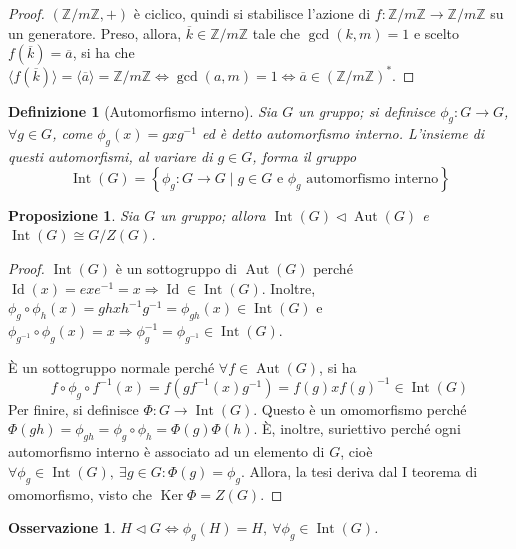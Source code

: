 \documentclass[11pt]{article}
\theoremstyle{style}
\newtheorem{definizione}{Definizione}[section]
\newtheorem{prop}{Proposizione}[section]
\newtheorem{osservazione}{Osservazione}[section]
\numberwithin{equation}{subsection}
\begin{document}
\begin{proof}
	$(\mathbb{Z} / m\mathbb{Z}, + )$ \`e ciclico, quindi si stabilisce l'azione di $f:\mathbb{Z} / m\mathbb{Z}\to \mathbb{Z}/ m\mathbb{Z}$ su un generatore.
	Preso, allora, $\overline{k} \in \mathbb{Z} / m\mathbb{Z} $ tale che $\operatorname{gcd}(k,m) =1$ e scelto $f(\overline{k}) = \overline{a}$, si ha che $\langle f(\overline{k}) \rangle= \langle \overline{a} \rangle= \mathbb{Z} / m\mathbb{Z} \iff \operatorname{gcd}(a,m) =1	\iff \overline{a} \in \left(\mathbb{Z} / m\mathbb{Z}\right) ^* $.
\end{proof}
\begin{definizione}
	[Automorfismo interno]
	Sia $G$ un gruppo; si definisce $\phi _g :G\to G$, $ \forall g \in G$, come $\phi_g (x) =gxg^{-1} $ ed \`e detto \textit{automorfismo interno}. 
	L'insieme di questi automorfismi, al variare di $g \in G$, forma il gruppo
	\[
	\operatorname{Int} (G) = \left\{ \phi _g : G\to G  \mid g \in G \text{ e } \phi _g \text{ automorfismo interno} \right\} 
	\] 
\end{definizione}
\begin{prop}\label{intcar}
	Sia $G$ un gruppo; allora $\operatorname{Int} (G) \lhd \operatorname{Aut} (G)$ e $\operatorname{Int} (G) \cong G / Z(G)$.
\end{prop}
	\begin{proof}
		$\operatorname{Int} (G)$ \`e un sottogruppo di $\operatorname{Aut} (G)$ perch\'e $\operatorname{Id} (x) = exe^{-1} = x  \Rightarrow \operatorname{Id} \in \operatorname{Int} (G)$.
		Inoltre, $\phi _g \circ \phi _h (x) = ghxh^{-1}g^{-1}=\phi _{gh} (x) \in \operatorname{Int} (G)$ e $\phi _{g^{-1} } \circ \phi _g (x) = x \Rightarrow \phi _g^{-1} = \phi _{g^{-1}} \in \operatorname{Int}(G)  $.

		\`E un sottogruppo normale perch\'e $\forall f \in \operatorname{Aut} (G)$, si ha 
		\[
		f \circ \phi _g \circ f^{-1}(x) = f \left(g f^{-1}(x) g^{-1}\right) =f(g) x f(g)^{-1} \in \operatorname{Int} (G)
		\] 
		Per finire, si definisce $\Phi : G \to \operatorname{Int} (G) $.
		Questo \`e un omomorfismo perch\'e $\Phi(gh)=\phi _{gh} = \phi _g\circ \phi _h = \Phi(g)\Phi(h)$.
		\`E, inoltre, suriettivo perch\'e ogni automorfismo interno \`e associato ad un elemento di $G$, cio\`e $\forall \phi _g \in \operatorname{Int} (G), \ \exists g \in G : \Phi(g) = \phi _g$.
		Allora, la tesi deriva dal I teorema di omomorfismo, visto che $\operatorname{Ker} \Phi = Z(G)$.
	\end{proof}
\begin{osservazione}\label{ossnorm}
	$H \lhd G \iff \phi _g(H) = H, \ \forall \phi _g \in \operatorname{Int} (G)$.
	\end{osservazione}
\end{document}
